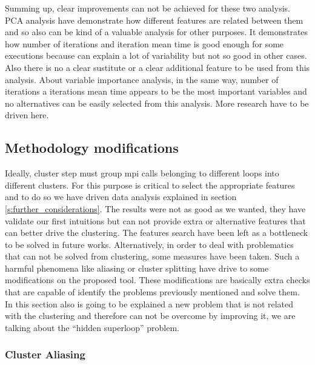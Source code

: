 % 

Summing up, clear improvements can not be achieved for these two analysis. PCA
analysis have demonstrate how different features are related between them and so
also can be kind of a valuable analysis for other purposes. It demonstrates how
number of iterations and iteration mean time is good enough for some executions
because can explain a lot of variability but not so good in other cases. Also
there is no a clear sustitute or a clear additional feature to be used
from this analysis. About variable importance analysis, in the same way, number
of iterations a iterations mean time appears to be the most important variables
and no alternatives can be easily selected from this analysis. More research
have to be driven here.

\subsection{Methodology modifications}\label{ss:methodology_modifications}

Ideally, cluster step must group mpi calls belonging to different loops into
different clusters. For this purpose is critical to select the appropriate
features and to do so we have driven data analysis explained in section
\ref{s:further_considerations}. The results were not as good as we wanted,
they have validate our first intuitions but can not provide extra or alternative
features that can better drive the clustering. The features search have been 
left as a bottleneck to be solved in future works. Alternatively, in order to
deal with problematics that can not be solved from clustering, some measures
have been taken. Such a harmful phenomena like aliasing or cluster splitting 
have drive to some modifications on the proposed tool. These modifications are 
basically extra checks that are capable of identify the problems previously 
mentioned and solve them. In this section also is going to be explained a new 
problem that is not related with the clustering and therefore can not be 
overcome by improving it, we are talking about the ``hidden superloop'' problem.

\subsubsection{Cluster Aliasing}\label{ss:cluster_aliasing}

